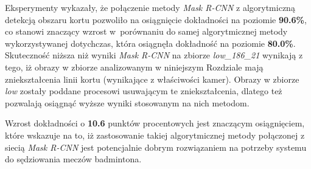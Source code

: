 Eksperymenty wykazały, że połączenie metody \textit{Mask R-CNN} z algorytmiczną detekcją obszaru kortu pozwoliło na osiągnięcie dokładności na poziomie \textbf{90.6\%}, co stanowi znaczący wzrost w~porównaniu do samej algorytmicznej metody wykorzystywanej dotychczas, która osiągnęła dokładność na poziomie \textbf{80.0\%}.
Skuteczność niższa niż wyniki \textit{Mask R-CNN} na zbiorze \textit{low\_186\_21} wynikają z tego, iż obrazy w zbiorze analizowanym w niniejszym Rozdziale mają zniekształcenia linii kortu (wynikające z właściwości kamer). Obrazy w zbiorze \textit{low} zostały poddane procesowi usuwającym te zniekształcenia, dlatego też pozwalają osiągnąć wyższe wyniki stosowanym na nich metodom.

Wzrost dokładności o \textbf{10.6} punktów procentowych jest znaczącym osiągnięciem, które wskazuje na to, iż zastosowanie takiej algorytmicznej metody połączonej z siecią \textit{Mask R-CNN} jest potencjalnie dobrym rozwiązaniem na potrzeby systemu do sędziowania meczów badmintona.
